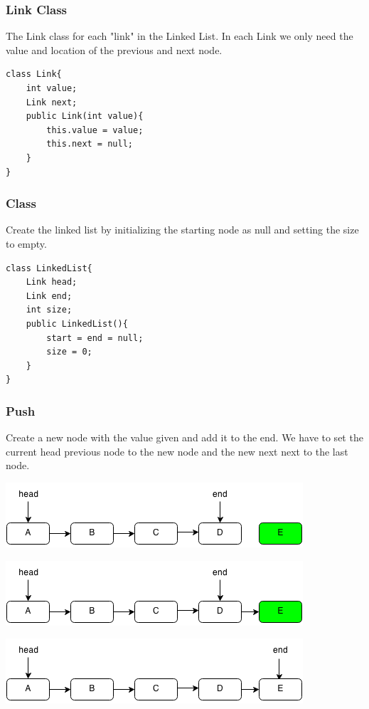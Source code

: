 \documentclass[11pt,oneside]{book}
\makeatletter
\def\maxwidth#1{\ifdim\Gin@nat@width>#1 #1\else\Gin@nat@width\fi}
\makeatother
\begin{document}
\subsubsection{Link Class}

The Link class for each "link" in the Linked List. In each Link we only need the value and location of the previous and next node.

\begin{lstlisting}
class Link{
    int value;
    Link next;
    public Link(int value){
        this.value = value;
        this.next = null;
    }
}
\end{lstlisting}

\subsubsection{Class}

Create the linked list by initializing the starting node as null and setting the size to empty.

\begin{lstlisting}
class LinkedList{
    Link head;
    Link end;
    int size;
    public LinkedList(){
        start = end = null;
        size = 0;
    }
}
\end{lstlisting}

\subsubsection{Push}

Create a new node with the value given and add it to the end. We have to set the current head previous node to the new node and the new next next to the last node.

\includegraphics[width=\maxwidth{\textwidth}]{linkedlistpush.png}

\includegraphics[width=\maxwidth{\textwidth}]{linkedlistpush2.png}

\includegraphics[width=\maxwidth{\textwidth}]{linkedlistpush3.png}
\end{document}
